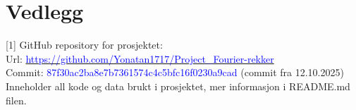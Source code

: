 \section*{Vedlegg}\label{vedlegg}
[1] GitHub repository for prosjektet: \\
\indent Url: \href{https://github.com/Yonatan1717/Project_Fourier-rekker}{\textcolor{blue}{https://github.com/Yonatan1717/Project\_Fourier-rekker}}\\
\indent Commit: \textcolor{blue}{87f30ac2ba8e7b7361574c4c5bfc16f0230a9cad} (commit fra 12.10.2025)\\
\indent Inneholder all kode og data brukt i prosjektet, mer informasjon i README.md filen.


